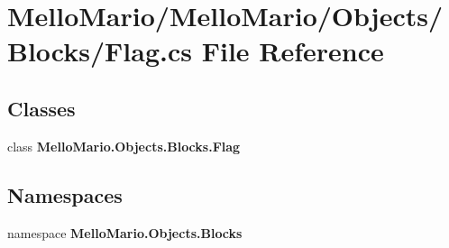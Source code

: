 \section{Mello\+Mario/\+Mello\+Mario/\+Objects/\+Blocks/\+Flag.cs File Reference}
\label{Flag_8cs}
\subsection*{Classes}
\begin{DoxyCompactItemize}
\item 
class \textbf{ Mello\+Mario.\+Objects.\+Blocks.\+Flag}
\end{DoxyCompactItemize}
\subsection*{Namespaces}
\begin{DoxyCompactItemize}
\item 
namespace \textbf{ Mello\+Mario.\+Objects.\+Blocks}
\end{DoxyCompactItemize}
